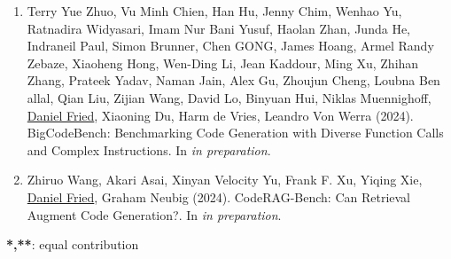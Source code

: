 \begin{enumerate}[leftmargin=-1mm,partopsep=0pt]
\item Terry Yue Zhuo, Vu Minh Chien, Han Hu, Jenny Chim, Wenhao Yu, Ratnadira Widyasari, Imam Nur Bani Yusuf, Haolan Zhan, Junda He, Indraneil Paul, Simon Brunner, Chen GONG, James Hoang, Armel Randy Zebaze, Xiaoheng Hong, Wen-Ding Li, Jean Kaddour, Ming Xu, Zhihan Zhang, Prateek Yadav, Naman Jain, Alex Gu, Zhoujun Cheng, Loubna Ben allal, Qian Liu, Zijian Wang, David Lo, Binyuan Hui, Niklas Muennighoff, \underline{Daniel Fried}, Xiaoning Du, Harm de Vries, Leandro Von Werra (2024). {BigCodeBench}: Benchmarking Code Generation with Diverse Function Calls and Complex Instructions. In \emph{in preparation}.

\item Zhiruo Wang, Akari Asai, Xinyan Velocity Yu, Frank F. Xu, Yiqing Xie, \underline{Daniel Fried}, Graham Neubig (2024). {CodeRAG-Bench}: Can Retrieval Augment Code Generation?. In \emph{in preparation}.

\end{enumerate}

\textbf{*,**}: equal contribution
